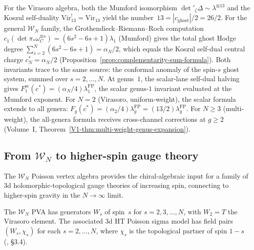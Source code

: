 \begin{remark}[Mumford exponent $=$ Koszul self-dual point]
\label{rem:mumford-koszul}
For the Virasoro algebra, both the Mumford isomorphism
$\det{}'_\zeta\Delta \sim \lambda^{\otimes 13}$ and the Koszul
self-duality $\mathrm{Vir}_{13}^! = \mathrm{Vir}_{13}$ yield the
number~$13 = |c_{\mathrm{ghost}}|/2 = 26/2$. For the general
$\mathcal{W}_N$ family, the Grothendieck--Riemann--Roch computation
$c_1(\det\pi_*\omega_C^{\otimes s}) = (6s^2-6s+1)\lambda_1$
(Mumford) gives the total ghost Hodge degree
$\sum_{s=2}^N(6s^2-6s+1) = \alpha_N/2$, which equals the
Koszul self-dual central charge $c_N^* = \alpha_N/2$
\textup{(}Proposition~\textup{\ref{prop:complementarity-sum-formula})}.
Both invariants trace to the same source: the conformal anomaly
of the spin-$s$ ghost system, summed over $s = 2,\ldots,N$.
At genus~$1$, the scalar-lane self-dual halving gives
$F_1^{\mathrm{sc}}(c^*) = (\alpha_N/4)\lambda_1^{\mathrm{FP}}$,
the scalar genus-$1$ invariant evaluated at the Mumford exponent.
For $N = 2$ (Virasoro, uniform-weight), the scalar formula
extends to all genera: $F_g(c^*) = (\alpha_2/4)\lambda_g^{\mathrm{FP}}
= (13/2)\lambda_g^{\mathrm{FP}}$.
For $N \ge 3$ (multi-weight), the all-genera formula receives
cross-channel corrections at $g \ge 2$
(Volume~I, Theorem~\ref{V1-thm:multi-weight-genus-expansion}).
\end{remark}


\subsection{From \texorpdfstring{$\mathcal{W}_N$}{W\_N} to higher-spin gauge theory}

\providecommand{\ModEnv}{\operatorname{ModEnv}}

The $\mathcal{W}_N$ Poisson vertex algebra provides the chiral-algebraic
input for a family of 3d holomorphic-topological gauge theories of
increasing spin, connecting to higher-spin gravity in the $N \to \infty$
limit.

\begin{definition}
The $\mathcal{W}_N$ PVA has generators $W_s$ of spin~$s$ for
$s = 2, 3, \ldots, N$, with $W_2 = T$ the Virasoro element. The
associated 3d HT Poisson sigma model has field pairs $(W_s, \chi_s)$
for each $s = 2, \ldots, N$, where $\chi_s$ is the topological partner
of spin $1-s$ \textup{(}\!\cite{KZ25}, \S3.4\textup{)}.
\end{definition}

